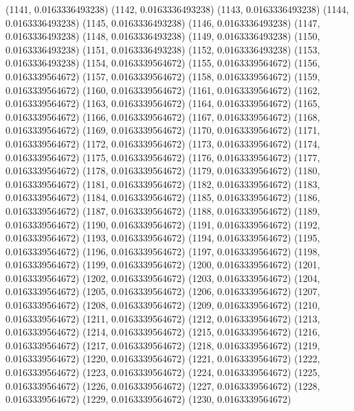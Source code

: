 {					(1141, 0.0163336493238)
					(1142, 0.0163336493238)
					(1143, 0.0163336493238)
					(1144, 0.0163336493238)
					(1145, 0.0163336493238)
					(1146, 0.0163336493238)
					(1147, 0.0163336493238)
					(1148, 0.0163336493238)
					(1149, 0.0163336493238)
					(1150, 0.0163336493238)
					(1151, 0.0163336493238)
					(1152, 0.0163336493238)
					(1153, 0.0163336493238)
					(1154, 0.0163339564672)
					(1155, 0.0163339564672)
					(1156, 0.0163339564672)
					(1157, 0.0163339564672)
					(1158, 0.0163339564672)
					(1159, 0.0163339564672)
					(1160, 0.0163339564672)
					(1161, 0.0163339564672)
					(1162, 0.0163339564672)
					(1163, 0.0163339564672)
					(1164, 0.0163339564672)
					(1165, 0.0163339564672)
					(1166, 0.0163339564672)
					(1167, 0.0163339564672)
					(1168, 0.0163339564672)
					(1169, 0.0163339564672)
					(1170, 0.0163339564672)
					(1171, 0.0163339564672)
					(1172, 0.0163339564672)
					(1173, 0.0163339564672)
					(1174, 0.0163339564672)
					(1175, 0.0163339564672)
					(1176, 0.0163339564672)
					(1177, 0.0163339564672)
					(1178, 0.0163339564672)
					(1179, 0.0163339564672)
					(1180, 0.0163339564672)
					(1181, 0.0163339564672)
					(1182, 0.0163339564672)
					(1183, 0.0163339564672)
					(1184, 0.0163339564672)
					(1185, 0.0163339564672)
					(1186, 0.0163339564672)
					(1187, 0.0163339564672)
					(1188, 0.0163339564672)
					(1189, 0.0163339564672)
					(1190, 0.0163339564672)
					(1191, 0.0163339564672)
					(1192, 0.0163339564672)
					(1193, 0.0163339564672)
					(1194, 0.0163339564672)
					(1195, 0.0163339564672)
					(1196, 0.0163339564672)
					(1197, 0.0163339564672)
					(1198, 0.0163339564672)
					(1199, 0.0163339564672)
					(1200, 0.0163339564672)
					(1201, 0.0163339564672)
					(1202, 0.0163339564672)
					(1203, 0.0163339564672)
					(1204, 0.0163339564672)
					(1205, 0.0163339564672)
					(1206, 0.0163339564672)
					(1207, 0.0163339564672)
					(1208, 0.0163339564672)
					(1209, 0.0163339564672)
					(1210, 0.0163339564672)
					(1211, 0.0163339564672)
					(1212, 0.0163339564672)
					(1213, 0.0163339564672)
					(1214, 0.0163339564672)
					(1215, 0.0163339564672)
					(1216, 0.0163339564672)
					(1217, 0.0163339564672)
					(1218, 0.0163339564672)
					(1219, 0.0163339564672)
					(1220, 0.0163339564672)
					(1221, 0.0163339564672)
					(1222, 0.0163339564672)
					(1223, 0.0163339564672)
					(1224, 0.0163339564672)
					(1225, 0.0163339564672)
					(1226, 0.0163339564672)
					(1227, 0.0163339564672)
					(1228, 0.0163339564672)
					(1229, 0.0163339564672)
					(1230, 0.0163339564672)
}
